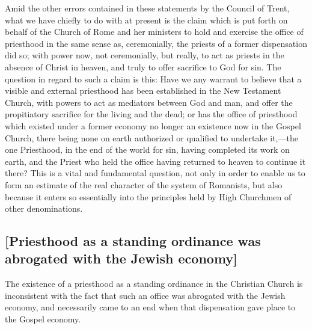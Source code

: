 \documentclass[
]{book}
\begin{document}
Amid the other errors contained in these statements by the Council of Trent, what we have chiefly to do with at present is the claim which is put forth on behalf of the Church of Rome and her ministers to hold and exercise the office of priesthood in the same sense as, ceremonially, the priests of a former dispensation did so; with power now, not ceremonially, but really, to act as priests in the absence of Christ in heaven, and truly to offer sacrifice to God for sin. The question in regard to such a claim is this: Have we any warrant to believe that a visible and external priesthood has been established in the New Testament Church, with powers to act as mediators between God and man, and offer the propitiatory sacrifice for the living and the dead; or has the office of priesthood which existed under a former economy no longer an existence now in the Gospel Church, there being none on earth authorized or qualified to undertake it,---the one Priesthood, in the end of the world for sin, having completed its work on earth, and the Priest who held the office having returned to heaven to continue it there? This is a vital and fundamental question, not only in order to enable us to form an estimate of the real character of the system of Romanists, but also because it enters so essentially into the principles held by High Churchmen of other denominations.

\hypertarget{priesthood-as-a-standing-ordinance-was-abrogated-with-the-jewish-economy}{%
\subsection{{[}Priesthood as a standing ordinance was abrogated with the Jewish economy{]}}\label{priesthood-as-a-standing-ordinance-was-abrogated-with-the-jewish-economy}}

The existence of a priesthood as a standing ordinance in the Christian Church is inconsistent with the fact that such an office was abrogated with the Jewish economy, and necessarily came to an end when that dispensation gave place to the Gospel economy.
\end{document}
